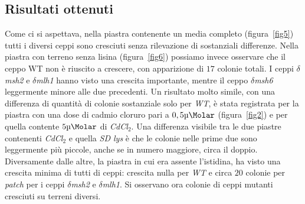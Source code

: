 \subsection*{Risultati ottenuti}
Come ci si aspettava, nella piastra contenente un media completo (figura~\ref{fig5})
tutti i diversi ceppi sono cresciuti senza rilevazione di sostanziali differenze. 
Nella piastra con terreno senza lisina (figura~\ref{fig6})
possiamo invece osservare che il ceppo WT non è riuscito a crescere, con apparizione di $17$ colonie totali. 
I ceppi \emph{$\delta$msh2} e \emph{$\delta$mlh1} hanno visto una crescita importante, mentre il ceppo \emph{$\delta$msh6} leggermente minore alle due precedenti. 
Un risultato molto simile, con una differenza di quantità di colonie sostanziale solo per \emph{WT}, è stata registrata per la piastra con una dose di cadmio cloruro pari a $0,5\si{\micro\Molar}$ (figura~\ref{fig2}) e per quella contente $5\si{\micro\Molar}$ di \emph{CdCl$_{2}$}.
Una differenza visibile tra le due piastre contenenti \emph{CdCl$_{2}$} e quella \emph{SD lys} è che le colonie nelle prime due sono leggermente più piccole, anche se in numero maggiore, circa il doppio. 
Diversamente dalle altre, la piastra in cui era assente l'istidina, ha visto una crescita minima di tutti di ceppi: crescita nulla per \emph{WT} e circa $20$ colonie per \emph{patch} per i ceppi \emph{$\delta$msh2} e \emph{$\delta$mlh1}. 
Si osservano ora colonie di ceppi mutanti cresciuti su terreni diversi.
